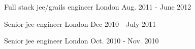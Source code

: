 \begin{cventries}
  \cventry
    {Full stack jee/grails engineer} %
    {} %
    {London} %
    {Aug. 2011 - June 2012} %
    {}
    {}

  \cventry
    {Senior jee engineer} %
    {} %
    {London} %
    {Dec 2010 - July 2011} %
    {}
    {}

  \cventry
    {Senior jee engineer} %
    {} %
    {London} %
    {Oct. 2010 - Nov. 2010} %
    {}
    {}
\end{cventries}



